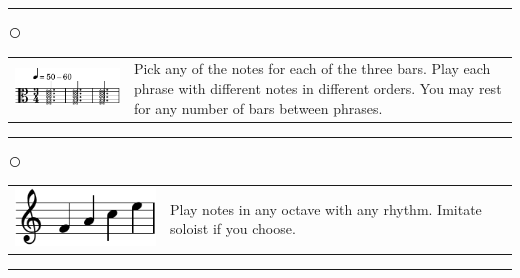 \documentclass[12pt]{article}
\begin{document}
\vspace{0.3cm}

\hrule

\vspace{0.1cm}

\textcircled{}



\begin{tabular}{l l}
\begin{minipage}{0.5\textwidth}
\includegraphics[scale=1.5]{melodyalto.pdf}
\end{minipage}
&
\begin{minipage}{0.4\textwidth}
Pick any of the notes for each of the three bars. Play each phrase with different notes in different orders. You may rest for any number of bars between phrases.
\end{minipage}
\end{tabular}
\vspace{0.3cm}

\hrule

\vspace{0.1cm}

\textcircled{}

\begin{tabular}{l l}
\begin{minipage}{0.5\textwidth}
\includegraphics[scale=1.5]{face.pdf}
\end{minipage}
&
\begin{minipage}{0.4\textwidth}
Play notes in any octave with any rhythm. Imitate soloist if you choose. 
\end{minipage}
\end{tabular}

\vspace{0.3cm}

\hrule

\vspace{0.1cm}
\end{document}
